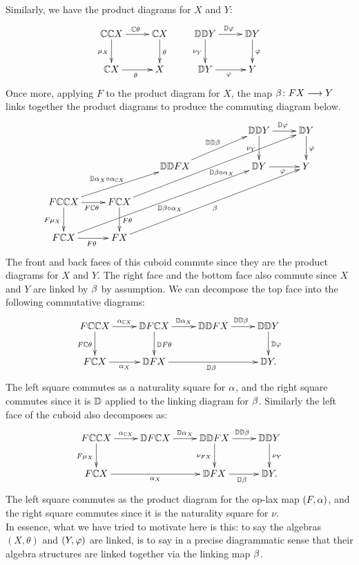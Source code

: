 \documentclass{amsart}
\theoremstyle{definition}
\begin{document}
Similarly, we have the product diagrams for $X$ and $Y$:
\[
\xymatrix{
    \bC \bC X \ar[r]^{\bC \theta} \ar[d]_{\mu_X} & \bC X \ar[d]^{\theta}\\
    \bC X \ar[r]_{\theta} & X
}
\qquad
\xymatrix{
    \bD \bD Y \ar[r]^{\bD \phz} \ar[d]_{\nu_Y} & \bD Y \ar[d]^{\phz}\\
    \bD Y \ar[r]_{\phz} & Y
}
\]
\noindent Once more, applying $F$ to the product diagram for $X$, the map $\beta \colon FX \longrightarrow Y$ links together the product diagrams to produce the commuting diagram below.
\[
\xymatrix{
    & & & & \bD \bD Y \ar[r]^{\bD \phz} \ar[d]_{\nu_Y} & \bD Y \ar[d]^{\phz}\\
    & & \bD \bD FX \ar[urr]^{\bD \bD \be} & & \bD Y \ar[r]_{\phz} & Y\\
    F \bC \bC X \ar[urr]^{\bD \al_X \circ \al_{\bC X} \; \; \; \;} \ar[r]_{F\bC \theta} \ar[d]_{F\mu_X} & F \bC X \ar[uurrrr]_{\; \; \bD \be \circ \al_X} \ar[d]^{F\theta} &&&&\\
    F \bC X \ar[r]_{F\theta} \ar[uurrrr]_{\; \; \bD \be \circ \al_X} & FX \ar[uurrrr]_{\beta} &&&&
}
\]
\noindent The front and back faces of this cuboid commute since they are the product diagrams for $X$ and $Y$. The right face and the bottom face also commute since $X$ and $Y$ are linked by $\beta$ by assumption.
We can decompose the top face into the following commutative diagrams:
\[
\xymatrix{
    F \bC \bC X \ar[r]^{\al_{\bC X}} \ar[d]_{F\bC \theta} & \bD F \bC X \ar[r]^{\bD \al_X} \ar[d]^{\bD F \theta} & \bD \bD FX \ar[r]^{\bD \bD \be} & \bD \bD Y \ar[d]^{\bD \phz}\\
    F \bC X \ar[r]_{\al_X} & \bD FX \ar[rr]_{\bD \be} & & \bD Y.
}
\]
\noindent The left square commutes as a naturality square for $\alpha$, and the right square commutes since it is $\mathbb{D}$ applied to the linking diagram for $\beta$. Similarly the left face of 
the cuboid also decomposes as:
\[
\xymatrix{
    F \bC \bC X \ar[r]^{\al_{\bC X}} \ar[d]_{F\mu_X} & \bD F \bC X \ar[r]^{\bD \al_X} & \bD \bD FX \ar[d]_{\nu_{FX}} \ar[r]^{\bD \bD \be} & \bD \bD Y \ar[d]^{\nu_Y}\\
    F \bC X \ar[rr]_{\al_X} & & \bD FX \ar[r]_{\bD \be} & \bD Y.
}
\]
\noindent The left square commutes as the product diagram for the op-lax map $(F,\alpha)$, and the right square commutes since it is the naturality square for $\nu$.\\

In essence, what we have tried to motivate here is this: to say the algebras $(X,\theta)$ and $(Y,\varphi)$ are linked, is to say in a precise diagrammatic sense that their 
algebra structures are linked together via the linking map $\beta$.\\
\end{document}
